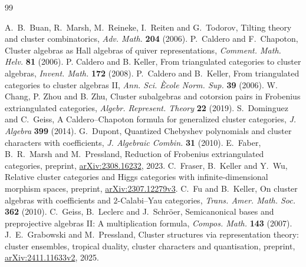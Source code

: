 \documentclass[11pt,reqno]{article}
\numberwithin{equation}{section}
\theoremstyle{definition}
\begin{document}
\begin{thebibliography}{99}
\small

A.~B.~Buan, R.~Marsh, M.~Reineke, I.~Reiten and G.~Todorov,
Tilting theory and cluster combinatorics,
\emph{Adv. Math.} \textbf{204} (2006).
P.~Caldero and F.~Chapoton,
Cluster algebras as Hall algebras of quiver representations,
\emph{Comment. Math. Helv.} \textbf{81} (2006).
P. Caldero and B. Keller, From triangulated categories to cluster algebras, \emph{Invent. Math.}
\textbf{172} (2008).
P.~Caldero and B.~Keller,
From triangulated categories to cluster algebras II,
\emph{Ann. Sci. \`Ecole Norm. Sup.} \textbf{39} (2006).
W. Chang, P. Zhou and B. Zhu, Cluster subalgebras and cotorsion pairs in Frobenius extriangulated
categories, \emph{Algebr. Represent. Theory}  \textbf{22} (2019).
S.~Dominguez and C.~Geiss,
A Caldero--Chapoton formula for generalized cluster categories,
\emph{J. Algebra} \textbf{399} (2014).
G.~Dupont,
Quantized Chebyshev polynomials and cluster characters with coefficients,
\emph{J. Algebraic Combin.} \textbf{31} (2010).
E.~Faber, B.~R.~Marsh and M.~Pressland,
Reduction of Frobenius extriangulated categories,
preprint, \href{https://arxiv.org/abs/2308.16232}{arXiv:2308.16232}, 2023.
C.~Fraser, B.~Keller and Y.~Wu,
Relative cluster categories and Higgs categories with infinite-dimensional morphism spaces,
preprint, \href{https://arxiv.org/abs/2307.12279v3}{arXiv:2307.12279v3}.
C.~Fu and B.~Keller,
On cluster algebras with coefficients and $2$-Calabi--Yau categories,
\emph{Trans. Amer. Math. Soc.} \textbf{362} (2010).
C.~Geiss, B.~Leclerc and J.~Schr\"oer,
Semicanonical bases and preprojective algebras II: A multiplication formula,
\emph{Compos. Math.} \textbf{143} (2007).
J.~E.~Grabowski and M.~Pressland,
Cluster structures via representation theory: cluster ensembles, tropical duality, cluster characters and quantisation,
preprint, \href{https://arxiv.org/abs/2411.11633v2}{arXiv:2411.11633v2}, 2025.


\end{thebibliography}
\end{document}
